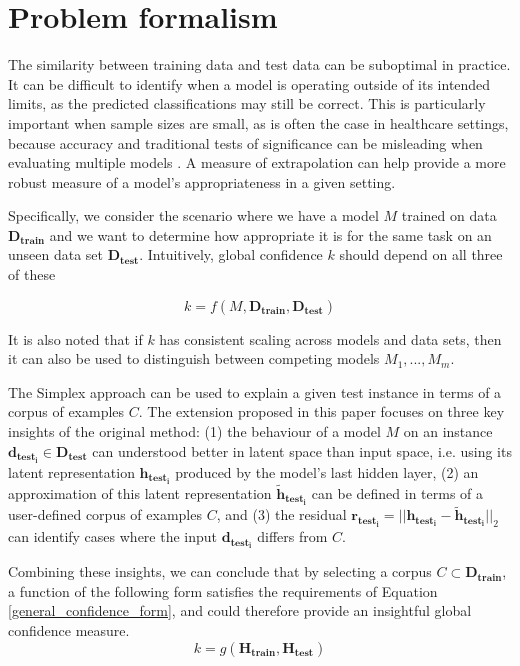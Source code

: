 \documentclass{article}
\begin{document}
\section{Problem formalism}

The similarity between training data and test data can be suboptimal in practice. It can be difficult to identify when a model is operating outside of its intended limits, as the predicted classifications may still be correct.
This is particularly important when sample sizes are small, as is often the case in healthcare settings, because accuracy and traditional tests of significance can be misleading when evaluating multiple models \cite{harvey_multiple_2013}. A measure of extrapolation can help provide a more robust measure of a model's appropriateness in a given setting.

Specifically, we consider the scenario where we have a model $M$ trained on data $\bm{D_{train}}$ and we want to determine how appropriate it is for the same task on an unseen data set $\bm{D_{test}}$. Intuitively, global confidence $k$ should depend on all three of these

\begin{equation}\label{general_confidence_form}
	k = f(M, \bm{D_{train}}, \bm{D_{test}})
\end{equation}

It is also noted that if $k$ has consistent scaling across models and data sets, then it can also be used to distinguish between competing models ${M_1, ..., M_m}$.

The Simplex approach can be used to explain a given test instance in terms of a corpus of examples $C$. The extension proposed in this paper focuses on three key insights of the original method: (1) the behaviour of a model $M$ on an instance $\bm{d_{test_i}} \in \bm{D_{test}}$ can understood better in latent space than input space, i.e. using its latent representation $\bm{h_{test_i}}$ produced by the model's last hidden layer, (2) an approximation of this latent representation $\bm{\tilde{h}_{test_i}}$  can be defined in terms of a user-defined corpus of examples $C$, and (3) the residual $\bm{r_{test_i}} = ||\bm{h_{test_i}} - \bm{\tilde{h}_{test_i}}||_2$ can identify cases where the input $\bm{d_{test_i}}$ differs from $C$.

Combining these insights, we can conclude that by selecting a corpus $C \subset \bm{D_{train}}$, a function of the following form satisfies the requirements of Equation \ref{general_confidence_form}, and could therefore provide an insightful global confidence measure.
\begin{equation}\label{simplex_confidence_form}
	k = g(\bm{H_{train}}, \bm{H_{test}})
\end{equation}
\end{document}
